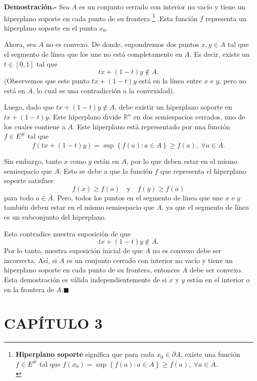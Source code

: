 \begin{enumerate}
	\textbf{Demostración.-}\; Sea  $A$ es un conjunto cerrado con interior no vacío y tiene un hiperplano soporte en cada punto de su frontera
	\footnote{
	    \textbf{Hiperplano soporte} significa que para cada $x_0 \in \partial A$, existe una función $f \in E^\#$ tal que $f(x_0) = \sup \left\{f(a):a\in A\right\}\geq f(a),\; \forall a\in \overline{A}$.\\
	\label{hipersoporte}}
	.Esta función $f$ representa un hiperplano soporte en el punto $x_0$.

	Ahora, sea $A$ no es convexo. De donde, supondremos dos puntos $x, y \in A$ tal que el segmento de línea que los une no está completamente en $A$. Es decir, existe un $t \in [0,1]$ tal que 
	$$tx + (1-t)y \notin A.$$ 
	(Observemos que este punto $tx + (1-t)y$ está en la línea entre $x$ e $y$, pero no está en $A$, lo cual es una contradicción a la convexidad).

	Luego, dado que $tx + (1-t)y \notin A$, debe existir un hiperplano soporte en $tx + (1-t)y$. Este hiperplano divide $\mathbb{R}^n$ en dos semiespacios cerrados, uno de los cuales contiene a $A$. Este hiperplano está representado por una función $f \in E^\#$ tal que 
	$$f(tx + (1-t)y) = \sup \left\{f(a):a\in A\right\}\geq f(a),\; \forall a\in \overline{A}.$$

	Sin embargo, tanto $x$ como $y$ están en $A$, por lo que deben estar en el mismo semiespacio que $A$. Esto se debe a que la función $f$ que representa el hiperplano soporte satisface 
	$$f(x) \geq f(a) \quad \text{y}\quad f(y) \geq f(a)$$ 
	para todo $a \in \overline{A}$. Pero, todos los puntos en el segmento de línea que une $x$ e $y$ también deben estar en el mismo semiespacio que $A$, ya que el segmento de línea es un subconjunto del hiperplano.

	Esto contradice nuestra suposición de que 
	$$tx + (1-t)y \notin A.$$ 
	Por lo tanto, nuestra suposición inicial de que $A$ no es convexo debe ser incorrecta. Así, si $A$ es un conjunto cerrado con interior no vacío y tiene un hiperplano soporte en cada punto de su frontera, entonces $A$ debe ser convexo. Esta demostración es válida independientemente de si $x$ y $y$ están en el interior o en la frontera de $A$.$\blacksquare$

\end{enumerate}

\pagebreak

\section*{CAPÍTULO 3}

